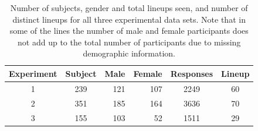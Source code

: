 \documentclass[12pt]{article}
\newcommand{\blue}[1]{{\color{blue} #1}} %
\newcommand{\hh}[1]{{\color{orange} #1}} %
\begin{document}

\begin{table}[hbtp]
\caption{Number of subjects, gender and total lineups seen, and number of distinct lineups for all three experimental data sets. Note that in some of the lines the number of male and female participants does not add up to the total number of participants due to missing demographic information. }%
\begin{center}
\begin{tabular}{ccrrcc}
   \hline \hline
 Experiment & Subject & Male & Female & Responses &Lineup\\ 
    \hline
1 & 239 & 121 & 107 & 2249 &  60 \\ 
  2 & 351 & 185 & 164 & 3636 &  70 \\ 
  3 & 155 & 103 &  52 & 1511 &  29 \\  
   \hline
\end{tabular}
\end{center}
\label{tbl:summary}
\end{table}
\end{document}
